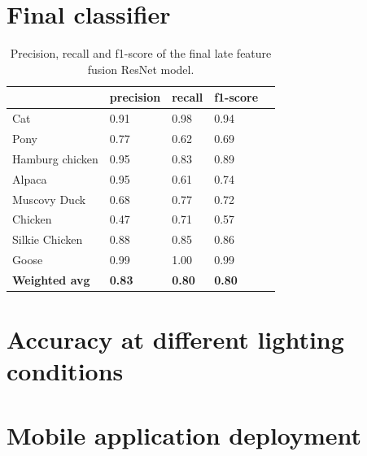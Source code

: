 \documentclass{l4proj}
\begin{document}
\section{Final classifier}

\begin{table}[]
  \centering
  \begin{tabular}{@{}lllll@{}}
  \toprule
                        & \textbf{precision} & \textbf{recall} & \textbf{f1-score} &  \\ \midrule
  Cat                   & 0.91               & 0.98            & 0.94              &  \\
  Pony                  & 0.77               & 0.62            & 0.69              &  \\
  Hamburg chicken       & 0.95               & 0.83            & 0.89              &  \\
  Alpaca                & 0.95               & 0.61            & 0.74              &  \\
  Muscovy Duck          & 0.68               & 0.77            & 0.72              &  \\
  Chicken               & 0.47               & 0.71            & 0.57              &  \\
  Silkie Chicken        & 0.88               & 0.85            & 0.86              &  \\
  Goose                 & 0.99               & 1.00            & 0.99              &  \\
  \textbf{Weighted avg} & \textbf{0.83}      & \textbf{0.80}   & \textbf{0.80}     &  \\ \bottomrule
  \end{tabular}
  \caption{Precision, recall and f1-score of the final late feature fusion ResNet model.}
  \label{table:final_classifier_scores}
\end{table}

\section{Accuracy at different lighting conditions}


\section{Mobile application deployment}
\end{document}
